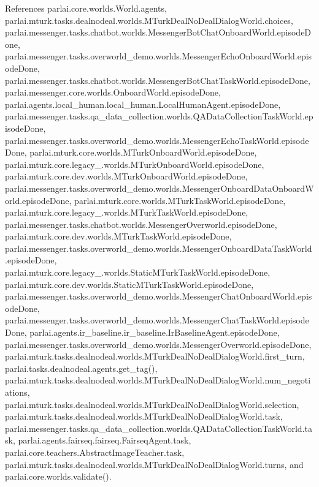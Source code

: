 References parlai.\+core.\+worlds.\+World.\+agents, parlai.\+mturk.\+tasks.\+dealnodeal.\+worlds.\+M\+Turk\+Deal\+No\+Deal\+Dialog\+World.\+choices, parlai.\+messenger.\+tasks.\+chatbot.\+worlds.\+Messenger\+Bot\+Chat\+Onboard\+World.\+episode\+Done, parlai.\+messenger.\+tasks.\+overworld\+\_\+demo.\+worlds.\+Messenger\+Echo\+Onboard\+World.\+episode\+Done, parlai.\+messenger.\+tasks.\+chatbot.\+worlds.\+Messenger\+Bot\+Chat\+Task\+World.\+episode\+Done, parlai.\+messenger.\+core.\+worlds.\+Onboard\+World.\+episode\+Done, parlai.\+agents.\+local\+\_\+human.\+local\+\_\+human.\+Local\+Human\+Agent.\+episode\+Done, parlai.\+messenger.\+tasks.\+qa\+\_\+data\+\_\+collection.\+worlds.\+Q\+A\+Data\+Collection\+Task\+World.\+episode\+Done, parlai.\+messenger.\+tasks.\+overworld\+\_\+demo.\+worlds.\+Messenger\+Echo\+Task\+World.\+episode\+Done, parlai.\+mturk.\+core.\+worlds.\+M\+Turk\+Onboard\+World.\+episode\+Done, parlai.\+mturk.\+core.\+legacy\+\_.\+worlds.\+M\+Turk\+Onboard\+World.\+episode\+Done, parlai.\+mturk.\+core.\+dev.\+worlds.\+M\+Turk\+Onboard\+World.\+episode\+Done, parlai.\+messenger.\+tasks.\+overworld\+\_\+demo.\+worlds.\+Messenger\+Onboard\+Data\+Onboard\+World.\+episode\+Done, parlai.\+mturk.\+core.\+worlds.\+M\+Turk\+Task\+World.\+episode\+Done, parlai.\+mturk.\+core.\+legacy\+\_.\+worlds.\+M\+Turk\+Task\+World.\+episode\+Done, parlai.\+messenger.\+tasks.\+chatbot.\+worlds.\+Messenger\+Overworld.\+episode\+Done, parlai.\+mturk.\+core.\+dev.\+worlds.\+M\+Turk\+Task\+World.\+episode\+Done, parlai.\+messenger.\+tasks.\+overworld\+\_\+demo.\+worlds.\+Messenger\+Onboard\+Data\+Task\+World.\+episode\+Done, parlai.\+mturk.\+core.\+legacy\+\_.\+worlds.\+Static\+M\+Turk\+Task\+World.\+episode\+Done, parlai.\+mturk.\+core.\+dev.\+worlds.\+Static\+M\+Turk\+Task\+World.\+episode\+Done, parlai.\+messenger.\+tasks.\+overworld\+\_\+demo.\+worlds.\+Messenger\+Chat\+Onboard\+World.\+episode\+Done, parlai.\+messenger.\+tasks.\+overworld\+\_\+demo.\+worlds.\+Messenger\+Chat\+Task\+World.\+episode\+Done, parlai.\+agents.\+ir\+\_\+baseline.\+ir\+\_\+baseline.\+Ir\+Baseline\+Agent.\+episode\+Done, parlai.\+messenger.\+tasks.\+overworld\+\_\+demo.\+worlds.\+Messenger\+Overworld.\+episode\+Done, parlai.\+mturk.\+tasks.\+dealnodeal.\+worlds.\+M\+Turk\+Deal\+No\+Deal\+Dialog\+World.\+first\+\_\+turn, parlai.\+tasks.\+dealnodeal.\+agents.\+get\+\_\+tag(), parlai.\+mturk.\+tasks.\+dealnodeal.\+worlds.\+M\+Turk\+Deal\+No\+Deal\+Dialog\+World.\+num\+\_\+negotiations, parlai.\+mturk.\+tasks.\+dealnodeal.\+worlds.\+M\+Turk\+Deal\+No\+Deal\+Dialog\+World.\+selection, parlai.\+mturk.\+tasks.\+dealnodeal.\+worlds.\+M\+Turk\+Deal\+No\+Deal\+Dialog\+World.\+task, parlai.\+messenger.\+tasks.\+qa\+\_\+data\+\_\+collection.\+worlds.\+Q\+A\+Data\+Collection\+Task\+World.\+task, parlai.\+agents.\+fairseq.\+fairseq.\+Fairseq\+Agent.\+task, parlai.\+core.\+teachers.\+Abstract\+Image\+Teacher.\+task, parlai.\+mturk.\+tasks.\+dealnodeal.\+worlds.\+M\+Turk\+Deal\+No\+Deal\+Dialog\+World.\+turns, and parlai.\+core.\+worlds.\+validate().

